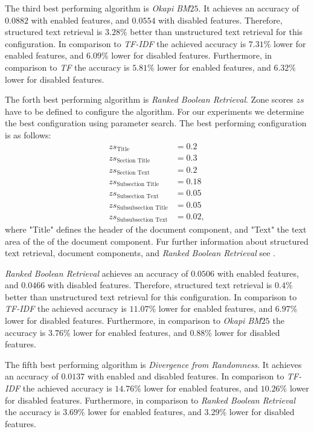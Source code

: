 The third best performing algorithm is \textit{Okapi BM$25$}. It achieves an accuracy of $0.0882$ with enabled features, and $0.0554$ with disabled features. Therefore, structured text retrieval is $3.28 \%$ better than unstructured text retrieval for this configuration. In comparison to \textit{TF-IDF} the achieved accuracy is $7.31 \%$ lower for enabled features, and $6.09 \%$ lower for disabled features. Furthermore, in comparison to \textit{TF} the accuracy is $5.81 \%$ lower for enabled features, and $6.32 \%$ lower for disabled features. 

The forth best performing algorithm is \textit{Ranked Boolean Retrieval}. Zone scores $zs$ have to be defined to configure the algorithm. For our experiments we determine the best configuration using parameter search. The best performing configuration is as follows:
\begin{align*}
  zs_{\text{Title}} & = 0.2                \nonumber \\
  zs_{\text{Section Title}} & = 0.3        \nonumber \\
  zs_{\text{Section Text}} & = 0.2         \nonumber \\
  zs_{\text{Subsection Title}} & = 0.18    \nonumber \\
  zs_{\text{Subsection Text}} & = 0.05     \nonumber \\
  zs_{\text{Subsubsection Title}} & =0.05  \nonumber \\
  zs_{\text{Subsubsection Text}} & = 0.02, \nonumber
\end{align*}
where "Title" defines the header of the document component, and "Text" the text area of the of the document component. Fur further information about structured text retrieval, document components, and \textit{Ranked Boolean Retrieval} see . 

\textit{Ranked Boolean Retrieval} achieves an accuracy of $0.0506$ with enabled features, and $0.0466$ with disabled features. Therefore, structured text retrieval is $0.4 \%$ better than unstructured text retrieval for this configuration. In comparison to \textit{TF-IDF} the achieved accuracy is $11.07 \%$ lower for enabled features, and $6.97 \%$ lower for disabled features. Furthermore, in comparison to \textit{Okapi BM$25$} the accuracy is $3.76 \%$ lower for enabled features, and $0.88 \%$ lower for disabled features.

The fifth best performing algorithm is \textit{Divergence from Randomness}. It achieves an accuracy of $0.0137$ with enabled and disabled features. In comparison to \textit{TF-IDF} the achieved accuracy is $14.76 \%$ lower for enabled features, and $10.26 \%$ lower for disabled features. Furthermore, in comparison to \textit{Ranked Boolean Retrieval} the accuracy is $3.69 \%$ lower for enabled features, and $3.29 \%$ lower for disabled features.


